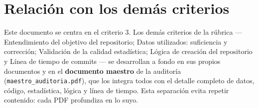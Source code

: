 \section{Relación con los demás criterios}

Este documento se centra en el criterio 3. Los demás criterios de la
rúbrica — Entendimiento del objetivo del repositorio; Datos utilizados: suficiencia y corrección; Validación de la calidad estadística; Lógica de creación del repositorio y Línea de tiempo de commits — se desarrollan a fondo en sus propios documentos
y en el \textbf{documento maestro} de la auditoría (\texttt{maestro\_auditoria.pdf}),
que los integra todos con el detalle completo de datos, código, estadística,
lógica y línea de tiempo. Esta separación evita repetir contenido: cada PDF
profundiza en lo suyo.
